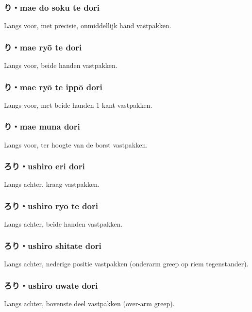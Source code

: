 \subsubsection{り・mae do soku te dori}
Langs voor, met precisie, onmiddellijk hand vastpakken.

\subsubsection{り・mae ry\={o} te dori}
Langs voor, beide handen vastpakken.

\subsubsection{り・mae ry\={o} te ipp\={o} dori}
Langs voor, met beide handen 1 kant vastpakken.

\subsubsection{り・mae muna dori}
Langs voor, ter hoogte van de borst vastpakken.

\subsubsection{ろり・ushiro eri dori}
Langs achter, kraag vastpakken.

\subsubsection{ろり・ushiro ry\={o} te dori}
Langs achter, beide handen vastpakken.

\subsubsection{ろり・ushiro shitate dori}
Langs achter, nederige positie vastpakken (onderarm greep op riem tegenstander).

\subsubsection{ろり・ushiro uwate dori}
Langs achter, bovenste deel vastpakken (over-arm greep).

